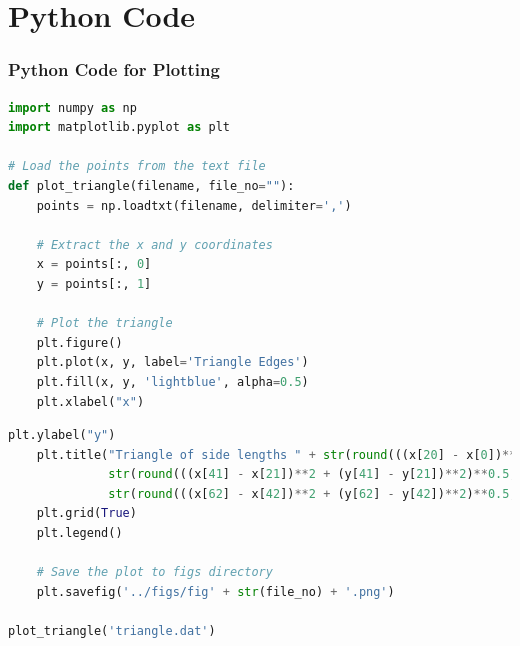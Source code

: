 \documentclass{beamer}
\theoremstyle{remark}
\numberwithin{equation}{section}
\begin{document}
\section{Python Code}
\begin{frame}[fragile]
\frametitle{Python Code for Plotting}
\begin{lstlisting}[language=Python]
import numpy as np
import matplotlib.pyplot as plt

# Load the points from the text file
def plot_triangle(filename, file_no=""):
    points = np.loadtxt(filename, delimiter=',')

    # Extract the x and y coordinates
    x = points[:, 0]
    y = points[:, 1]
    
    # Plot the triangle
    plt.figure()
    plt.plot(x, y, label='Triangle Edges')
    plt.fill(x, y, 'lightblue', alpha=0.5)
    plt.xlabel("x")
\end{lstlisting}
\end{frame}
\begin{frame}[fragile]
\begin{lstlisting}[language=Python]
    plt.ylabel("y")
    plt.title("Triangle of side lengths " + str(round(((x[20] - x[0])**2 + (y[20] - y[0])**2)**0.5, 2)) + ", " +
              str(round(((x[41] - x[21])**2 + (y[41] - y[21])**2)**0.5, 2)) + ", " +
              str(round(((x[62] - x[42])**2 + (y[62] - y[42])**2)**0.5, 2)))
    plt.grid(True)
    plt.legend()

    # Save the plot to figs directory
    plt.savefig('../figs/fig' + str(file_no) + '.png')

plot_triangle('triangle.dat')
\end{lstlisting}
\end{frame}
\end{document}

